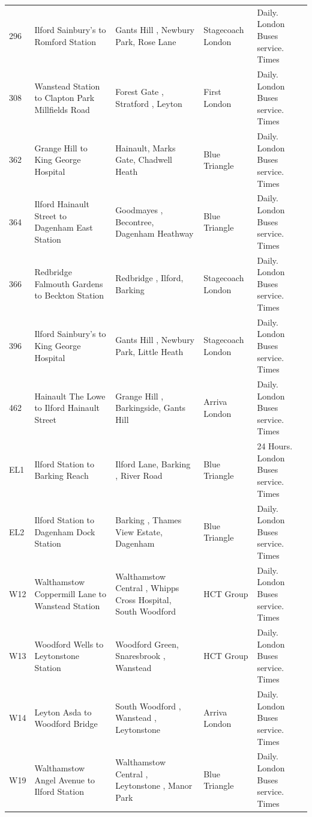 \documentclass{article}
\begin{document}
\begin{tabular}{lllll}
296 & Ilford Sainbury's to Romford Station & Gants Hill , Newbury Park, Rose Lane & Stagecoach London & Daily. London Buses service. Times \\
308 & Wanstead Station to Clapton Park Millfields Road & Forest Gate , Stratford , Leyton & First London & Daily. London Buses service. Times \\
362 & Grange Hill to King George Hospital & Hainault, Marks Gate, Chadwell Heath & Blue Triangle & Daily. London Buses service. Times \\
364 & Ilford Hainault Street to Dagenham East Station & Goodmayes , Becontree, Dagenham Heathway & Blue Triangle & Daily. London Buses service. Times \\
366 & Redbridge Falmouth Gardens to Beckton Station & Redbridge , Ilford, Barking & Stagecoach London & Daily. London Buses service. Times \\
396 & Ilford Sainbury's to King George Hospital & Gants Hill , Newbury Park, Little Heath & Stagecoach London & Daily. London Buses service. Times \\
462 & Hainault The Lowe to Ilford Hainault Street & Grange Hill , Barkingside, Gants Hill & Arriva London & Daily. London Buses service. Times \\
EL1 & Ilford Station to Barking Reach & Ilford Lane, Barking , River Road & Blue Triangle & 24 Hours. London Buses service. Times \\
EL2 & Ilford Station to Dagenham Dock Station & Barking , Thames View Estate, Dagenham & Blue Triangle & Daily. London Buses service. Times \\
W12 & Walthamstow Coppermill Lane to Wanstead Station & Walthamstow Central , Whipps Cross Hospital, South Woodford & HCT Group & Daily. London Buses service. Times \\
W13 & Woodford Wells to Leytonstone Station & Woodford Green, Snaresbrook , Wanstead & HCT Group & Daily. London Buses service. Times \\
W14 & Leyton Asda to Woodford Bridge & South Woodford , Wanstead , Leytonstone & Arriva London & Daily. London Buses service. Times \\
W19 & Walthamstow Angel Avenue to Ilford Station & Walthamstow Central , Leytonstone , Manor Park & Blue Triangle & Daily. London Buses service. Times \\
\bottomrule
\end{tabular}
\end{document}
